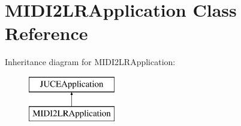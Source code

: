 \hypertarget{class_m_i_d_i2_l_r_application}{}\section{M\+I\+D\+I2\+L\+R\+Application Class Reference}
\label{class_m_i_d_i2_l_r_application}
Inheritance diagram for M\+I\+D\+I2\+L\+R\+Application\+:\begin{figure}[H]
\begin{center}
\leavevmode
\includegraphics[height=2.000000cm]{class_m_i_d_i2_l_r_application}
\end{center}
\end{figure}
